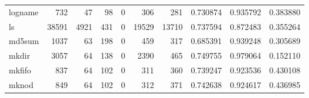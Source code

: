 \begin{tabular}{lrrrrrrrrr}
logname   &                                                732 &                                                 47 &                                                 98 &                                                  0 &                                                306 &                                                281 &                                           0.730874 &                               0.935792 &                             0.383880 \\
ls        &                                              38591 &                                               4921 &                                                431 &                                                  0 &                                              19529 &                                              13710 &                                           0.737594 &                               0.872483 &                             0.355264 \\
md5sum    &                                               1037 &                                                 63 &                                                198 &                                                  0 &                                                459 &                                                317 &                                           0.685391 &                               0.939248 &                             0.305689 \\
mkdir     &                                               3057 &                                                 64 &                                                138 &                                                  0 &                                               2390 &                                                465 &                                           0.749755 &                               0.979064 &                             0.152110 \\
mkfifo    &                                                837 &                                                 64 &                                                102 &                                                  0 &                                                311 &                                                360 &                                           0.739247 &                               0.923536 &                             0.430108 \\
mknod     &                                                849 &                                                 64 &                                                102 &                                                  0 &                                                312 &                                                371 &                                           0.742638 &                               0.924617 &                             0.436985 \\

\end{tabular}
